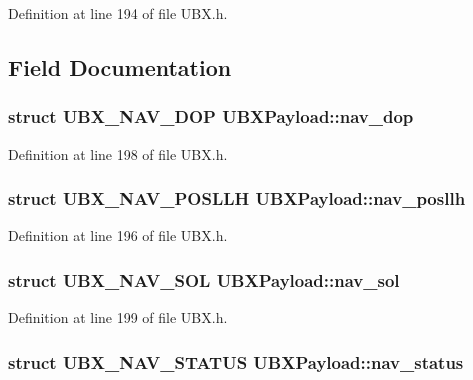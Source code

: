 \-Definition at line 194 of file \-U\-B\-X.\-h.



\subsection{\-Field \-Documentation}
\hypertarget{union_u_b_x_payload_aabf42aafbe0f26fe6224cd255ddfcbd3}{
\subsubsection[{nav\-\_\-dop}]{\setlength{\rightskip}{0pt plus 5cm}struct {\bf \-U\-B\-X\-\_\-\-N\-A\-V\-\_\-\-D\-O\-P} {\bf \-U\-B\-X\-Payload\-::nav\-\_\-dop}}}\label{union_u_b_x_payload_aabf42aafbe0f26fe6224cd255ddfcbd3}


\-Definition at line 198 of file \-U\-B\-X.\-h.

\hypertarget{union_u_b_x_payload_ac43eeda1b5ade727f5856e57ae8d4fdb}{
\subsubsection[{nav\-\_\-posllh}]{\setlength{\rightskip}{0pt plus 5cm}struct {\bf \-U\-B\-X\-\_\-\-N\-A\-V\-\_\-\-P\-O\-S\-L\-L\-H} {\bf \-U\-B\-X\-Payload\-::nav\-\_\-posllh}}}\label{union_u_b_x_payload_ac43eeda1b5ade727f5856e57ae8d4fdb}


\-Definition at line 196 of file \-U\-B\-X.\-h.

\hypertarget{union_u_b_x_payload_aba19134cfa2bf927f5ae568a4d1fa82f}{
\subsubsection[{nav\-\_\-sol}]{\setlength{\rightskip}{0pt plus 5cm}struct {\bf \-U\-B\-X\-\_\-\-N\-A\-V\-\_\-\-S\-O\-L} {\bf \-U\-B\-X\-Payload\-::nav\-\_\-sol}}}\label{union_u_b_x_payload_aba19134cfa2bf927f5ae568a4d1fa82f}


\-Definition at line 199 of file \-U\-B\-X.\-h.

\hypertarget{union_u_b_x_payload_a10f246cbf1341ebaca17da26a61eb344}{
\subsubsection[{nav\-\_\-status}]{\setlength{\rightskip}{0pt plus 5cm}struct {\bf \-U\-B\-X\-\_\-\-N\-A\-V\-\_\-\-S\-T\-A\-T\-U\-S} {\bf \-U\-B\-X\-Payload\-::nav\-\_\-status}}}\label{union_u_b_x_payload_a10f246cbf1341ebaca17da26a61eb344}


